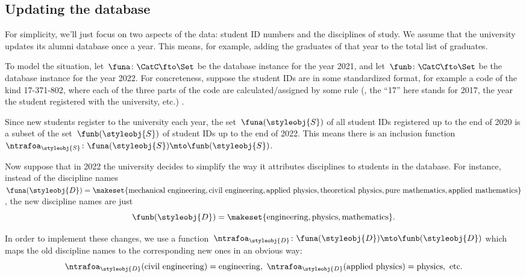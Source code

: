\subsection{Updating the database}

For simplicity, we'll just focus on two aspects of the data: student ID numbers and the disciplines of study.
We assume that the university updates its alumni database once a year.
This means, for example, adding the graduates of that year to the total list of graduates.

To model the situation, let~$\funa \colon \CatC \fto \Set$ be the database instance for the year 2021, and let~$\funb \colon \CatC \fto \Set$ be the database instance for the year 2022.
For concreteness,  suppose the student IDs are in some standardized format, for example a code of the kind 17-371-802, where each of the three parts of the code are calculated/assigned by some rule (, the ``17'' here stands for 2017, the year the student registered with the university, etc.)
.

Since new students register to the university each year, the set~$\funa(\styleobj{S})$ of all student IDs registered up to the end of 2020 is a subset of the set~$\funb(\styleobj{S})$ of student IDs up to the end of 2022.
This means there is an inclusion function~$\ntrafoa_{\styleobj{S}} \colon  \funa(\styleobj{S}) \mto \funb(\styleobj{S})$.

Now suppose that in 2022 the university decides to simplify the way it attributes disciplines to students in the database.
For instance, instead of the discipline names~$\funa(\styleobj{D}) = \makeset{ \text{mechanical engineering},  \text{civil engineering}, \text{applied physics}, \text{theoretical physics}, \text{pure mathematics}, \text{applied mathematics} }$,
the new discipline names are just
%
\begin{equation}
    \funb(\styleobj{D}) = \makeset{ \text{engineering}, \text{physics}, \text{mathematics} }.
\end{equation}

In order to implement these changes, we use a function~$\ntrafoa_{\styleobj{D}}\colon \funa(\styleobj{D}) \mto \funb(\styleobj{D})$ which maps the old discipline names to the corresponding new ones in an obvious way:
\begin{equation}
    \ntrafoa_{\styleobj{D}}(\text{civil engineering}) = \text{engineering}, \ \ntrafoa_{\styleobj{D}}(\text{applied physics}) = \text{physics}, \ \text{etc.}
\end{equation}

